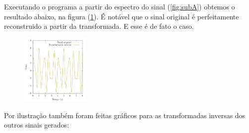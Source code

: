 \documentclass[a4paper, 11pt]{article}
\begin{document}
Executando o programa a partir do espectro do sinal (\ref{fig:subA}) obtemos o resultado abaixo, na
figura (\ref{fig:idft}). É notável que o sinal original é perfeitamente reconstruido a partir da
transformada. E esse é de fato o caso.


\begin{figure}[h!]
  \centering
  \caption{}
  \includegraphics[width=0.30\textwidth]{inv-dft-A}
  \label{fig:idft} 
\end{figure}

Por ilustração também foram feitas gráficos para as transformadas inversas dos outros sinais
gerados:
\end{document}
